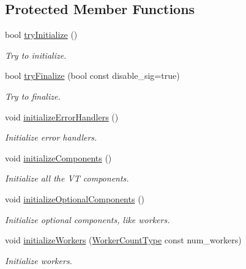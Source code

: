 \subsection*{Protected Member Functions}
\begin{DoxyCompactItemize}
\item 
bool \hyperlink{structvt_1_1runtime_1_1_runtime_a651174e20fa3db2493bd4c0cf2e8be3c}{try\+Initialize} ()
\begin{DoxyCompactList}\small\item\em Try to initialize. \end{DoxyCompactList}\item 
bool \hyperlink{structvt_1_1runtime_1_1_runtime_a10f74f2fa128ce1f7aa3d69395c64f8c}{try\+Finalize} (bool const disable\+\_\+sig=true)
\begin{DoxyCompactList}\small\item\em Try to finalize. \end{DoxyCompactList}\item 
void \hyperlink{structvt_1_1runtime_1_1_runtime_adf6407cff70ac8c332d75911a81b508d}{initialize\+Error\+Handlers} ()
\begin{DoxyCompactList}\small\item\em Initialize error handlers. \end{DoxyCompactList}\item 
void \hyperlink{structvt_1_1runtime_1_1_runtime_a798be8c8813889ef0aacdbc8668d8a41}{initialize\+Components} ()
\begin{DoxyCompactList}\small\item\em Initialize all the VT components. \end{DoxyCompactList}\item 
void \hyperlink{structvt_1_1runtime_1_1_runtime_a61abc4a1b440263bd129ee0950a05e69}{initialize\+Optional\+Components} ()
\begin{DoxyCompactList}\small\item\em Initialize optional components, like workers. \end{DoxyCompactList}\item 
void \hyperlink{structvt_1_1runtime_1_1_runtime_a264ccc1306fc3b5dfc20830fa313cba0}{initialize\+Workers} (\hyperlink{namespacevt_aa93398ea48f2cb6c188512250f7cc248}{Worker\+Count\+Type} const num\+\_\+workers)
\begin{DoxyCompactList}\small\item\em Initialize workers. \end{DoxyCompactList}\item 

\end{DoxyCompactItemize}
